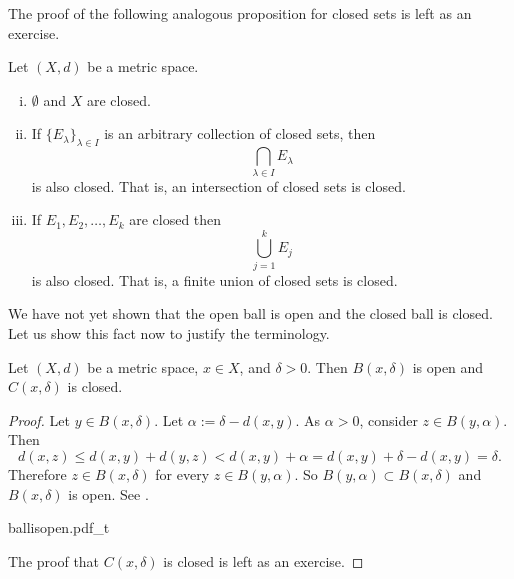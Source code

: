 The proof of the following analogous proposition for closed sets
is left as an exercise.

\begin{prop} \label{prop:topology:closed}
Let $(X,d)$ be a metric space.
\begin{enumerate}[(i)]
\item \label{topology:closedi} $\emptyset$ and $X$ are closed.
\item \label{topology:closedii} If $\{ E_\lambda \}_{\lambda \in I}$ is
an arbitrary collection of closed sets, then
\begin{equation*}
\bigcap_{\lambda \in I} E_\lambda
\end{equation*}
is also closed.  That is, an intersection of closed sets is closed.
\item \label{topology:closediii} If $E_1, E_2, \ldots, E_k$ are closed then
\begin{equation*}
\bigcup_{j=1}^k E_j
\end{equation*}
is also closed.  That is, a finite union of closed sets is closed.
\end{enumerate}
\end{prop}

We have not yet shown that the open ball is open and the closed ball is
closed.  Let us show this fact now to justify the terminology.

\begin{prop} \label{prop:topology:ballsopenclosed}
Let $(X,d)$ be a metric space, $x \in X$, and $\delta > 0$.  Then
$B(x,\delta)$ is open and 
$C(x,\delta)$ is closed.
\end{prop}

\begin{proof}
Let $y \in B(x,\delta)$.  Let $\alpha := \delta-d(x,y)$.  As $\alpha
> 0$, consider $z \in B(y,\alpha)$.  Then
\begin{equation*}
d(x,z) \leq d(x,y) + d(y,z) < d(x,y) + \alpha = d(x,y) + \delta-d(x,y) =
\delta .
\end{equation*}
Therefore $z \in B(x,\delta)$ for every $z \in B(y,\alpha)$.  So $B(y,\alpha) \subset B(x,\delta)$ and
$B(x,\delta)$ is open.  See .

\begin{myfigureht}
{ballisopen.pdf_t}
\caption{Proof that $B(x,\delta)$ is open: $B(y,\alpha) \subset
B(x,\delta)$ with the triangle inequality illustrated.\label{fig:ballisopen}}
\end{myfigureht}

The proof that $C(x,\delta)$ is closed is left as an exercise.
\end{proof}

